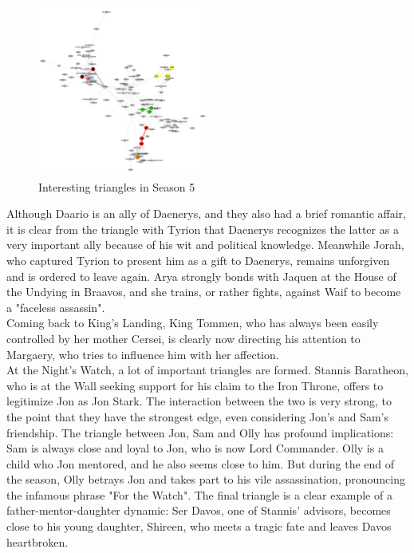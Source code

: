 \documentclass[10pt,twocolumn,letterpaper]{article}
\begin{document}
\begin{figure}[!h]
    \centering
    \includegraphics[width=0.5\textwidth]{img/s5/s5_triangles.jpg}
    \caption{\small{Interesting triangles in Season 5}}
\end{figure}


Although Daario is an ally of Daenerys, and they also had a brief romantic affair, it is clear from the triangle with Tyrion that Daenerys recognizes the latter as a very important ally because of his wit and political knowledge. Meanwhile Jorah, who captured Tyrion to present him as a gift to Daenerys, remains unforgiven and is ordered to leave again. Arya strongly bonds with Jaquen at the House of the Undying in Braavos, and she trains, or rather fights, against Waif to become a "faceless assassin". \\

Coming back to King's Landing, King Tommen, who has always been easily controlled by her mother Cersei, is clearly now directing his attention to Margaery, who tries to influence him with her affection.\\

At the Night's Watch, a lot of important triangles are formed. Stannis Baratheon, who is at the Wall seeking support for his claim to the Iron Throne, offers to legitimize Jon as Jon Stark. The interaction between the two is very strong, to the point that they have the strongest edge, even considering Jon's and Sam's friendship. The triangle between Jon, Sam and Olly has profound implications: Sam is always close and loyal to Jon, who is now Lord Commander. Olly is a child who Jon mentored, and he also seems close to him. But during the end of the season, Olly betrays Jon and takes part to his vile assassination, pronouncing the infamous phrase "For the Watch". The final triangle is a clear example of a father-mentor-daughter dynamic: Ser Davos, one of Stannis' advisors, becomes close to his young daughter, Shireen, who meets a tragic fate and leaves Davos heartbroken. \\
\end{document}
